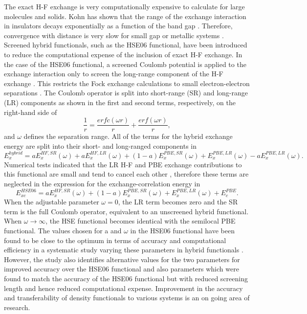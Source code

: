 \documentclass[11pt, twoside]{report}
\begin{document}
The exact H-F exchange is very computationally expensive to calculate for large molecules and solids. Kohn has shown that the range of the exchange interaction in insulators decays exponentially as a function of the band gap \cite{HSE_ref13}. Therefore, convergence with distance is very slow for small gap or metallic systems \cite{HSE}.
Screened hybrid functionals, such as the HSE06 functional, have been introduced to reduce the computational expense of the inclusion of exact H-F exchange. In the case of the HSE06 functional, a screened Coulomb potential is applied to the exchange interaction only to screen the long-range component of the H-F exchange \cite{HSE2}. This restricts the Fock exchange calculations to small electron-electron separations \cite{HSE_systematic}. The Coulomb operator is split into short-range (SR) and long-range (LR) components as shown in the first and second terms, respectively, on the right-hand side of
\begin{equation}\label{HSE_SR_LR}
\frac{1}{r} = \frac{erfc(\omega r)}{r} + \frac{erf(\omega r)}{r},
\end{equation}
and $\omega$ defines the separation range. All of the terms for the hybrid exchange energy are split into their short- and long-ranged components in
\begin{equation}\label{Ex_SR_LR}
E_x^{hybrid} = aE_x^{HF,SR}(\omega) + aE_x^{HF,LR}(\omega) + (1-a)E_x^{PBE,SR}(\omega) + E_x^{PBE,LR}(\omega) - aE_x^{PBE,LR}(\omega) .
\end{equation}
Numerical tests indicated that the LR H-F and PBE exchange contributions to this functional are small and tend to cancel each other \cite{HSE}, therefore these terms are neglected in the expression for the exchange-correlation energy in
\begin{equation}\label{HSE06}
E_{xc}^{HSE06} = aE_x^{HF,SR}(\omega) + (1-a)E_x^{PBE,SR}(\omega) + E_x^{PBE,LR}(\omega) + E_c^{PBE} .
\end{equation}
When the adjustable parameter $\omega = 0$, the LR term becomes zero and the SR term is the full Coulomb operator, equivalent to an unscreened hybrid functional. When $\omega \rightarrow \infty $, the HSE functional becomes identical with the semilocal PBE functional. The values chosen for a and $\omega$ in the HSE06 functional have been found to be close to the optimum in terms of accuracy and computational efficiency in a systematic study varying these parameters in hybrid functionals \cite{HSE_systematic}. However, the study also identifies alternative values for the two parameters for improved accuracy over the HSE06 functional and also parameters which were found to match the accuracy of the HSE06 functional but with reduced screening length and hence reduced computational expense. Improvement in the accuracy and transferability of density functionals to various systems is an on going area of research.
\end{document}
